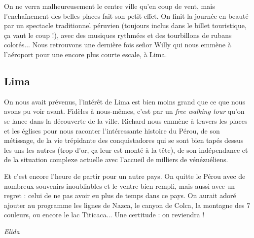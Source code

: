 On ne verra malheureusement le centre ville qu'en coup de vent, mais
l'enchaînement des belles places fait son petit effet. On finit la
journée en beauté par un spectacle traditionnel péruvien (toujours
inclus dans le billet touristique, ça vaut le coup !), avec des musiques
rythmées et des tourbillons de rubans colorés... Nous retrouvons une
dernière fois señor Willy qui nous emmène à l'aéroport pour une encore
plus courte escale, à Lima.

\hypertarget{lima}{%
\subsection{Lima}\label{lima}}

On nous avait prévenus, l'intérêt de Lima est bien moins grand que ce
que nous avons pu voir avant. Fidèles à nous-mêmes, c'est par un
\emph{free walking tour} qu'on se lance dans la découverte de la ville.
Richard nous emmène à travers les places et les églises pour nous
raconter l'intéressante histoire du Pérou, de son métissage, de la vie
trépidante des conquistadores qui se sont bien tapés dessus les uns les
autres (trop d'or, ça leur est monté à la tête), de son indépendance et
de la situation complexe actuelle avec l'accueil de milliers de
vénézuéliens.

Et c'est encore l'heure de partir pour un autre pays. On quitte le Pérou
avec de nombreux souvenirs inoubliables et le ventre bien rempli, mais
aussi avec un regret : celui de ne pas avoir eu plus de temps dans ce
pays. On aurait adoré ajouter au programme les lignes de Nazca, le
canyon de Colca, la montagne des 7 couleurs, ou encore le lac
Titicaca... Une certitude : on reviendra !

\emph{Elida}
